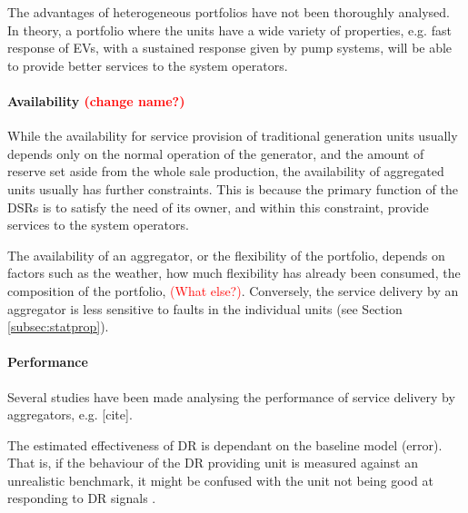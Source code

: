 The advantages of heterogeneous portfolios have not been thoroughly analysed. In theory, a portfolio where the units have a wide variety of properties, e.g. fast response of EVs, with a sustained response given by pump systems, will be able to provide better services to the system operators.

\paragraph{Availability \textcolor{red}{(change name?)}}
While the availability for service provision of traditional generation units usually depends only on the normal operation of the generator, and the amount of reserve set aside from the whole sale production, the availability of aggregated units usually has further constraints. This is because the primary function of the DSRs is to satisfy the need of its owner, and within this constraint, provide services to the system operators.

The availability of an aggregator, or the flexibility of the portfolio, depends on factors such as the weather, how much flexibility has already been consumed, the composition of the portfolio, \textcolor{red}{(What else?)}. Conversely, the service delivery by an aggregator is less sensitive to faults in the individual units (see Section \ref{subsec:statprop}).

\paragraph{Performance}
Several studies have been made analysing the performance of service delivery by aggregators, e.g. [cite]. 

The estimated effectiveness of DR is dependant on the baseline model (error). That is, if the behaviour of the DR providing unit is measured against an unrealistic benchmark, it might be confused with the unit not being good at responding to DR signals \cite{mathieu2011variability}.


